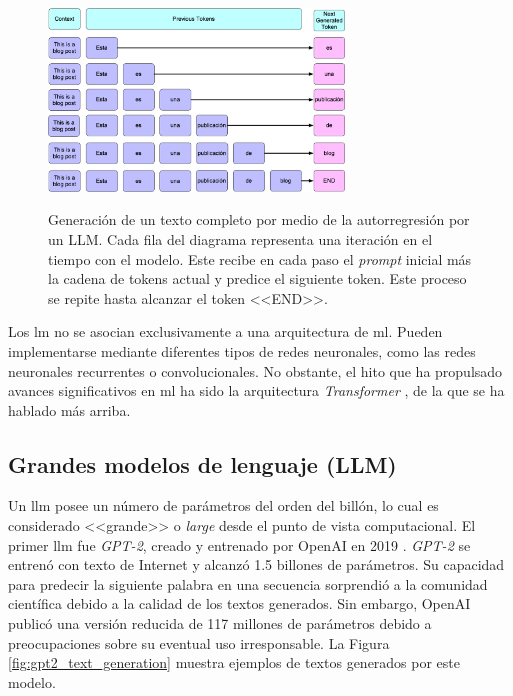 \begin{figure}[H]
    \caption[Generación de un texto completo por medio de la autorregresión por un LLM]{Generación de un texto completo por medio de la autorregresión por un LLM. Cada fila del diagrama representa una iteración en el tiempo con el modelo. Este recibe en cada paso el \emph{prompt} inicial más la cadena de tokens actual y predice el siguiente token. Este proceso se repite hasta alcanzar el token <<END>>.}
    \centering
    \includegraphics[width=0.7\textwidth]{./figuras/text-gen-diagram-autoregressive.png}
    \label{fig:llm_generation_example}
\end{figure}

Los \gls{lm} no se asocian exclusivamente a una arquitectura de \gls{ml}. Pueden implementarse mediante diferentes tipos de redes neuronales, como las redes neuronales recurrentes o convolucionales. No obstante, el hito que ha propulsado avances significativos en \gls{ml} ha sido la arquitectura \emph{Transformer} \citep{vaswaniAttentionAllYou2017}, de la que se ha hablado más arriba.

\subsection{Grandes modelos de lenguaje (LLM)}

Un \gls{llm} posee un número de parámetros del orden del billón, lo cual es considerado <<grande>> o \emph{large} desde el punto de vista computacional. El primer \gls{llm} fue \emph{GPT-2}, creado y entrenado por OpenAI en 2019 \citep{radfordLanguageModelsAre2019}. \emph{GPT-2} se entrenó con texto de Internet y alcanzó 1.5 billones de parámetros. Su capacidad para predecir la siguiente palabra en una secuencia sorprendió a la comunidad científica debido a la calidad de los textos generados. Sin embargo, OpenAI publicó una versión reducida de 117 millones de parámetros debido a preocupaciones sobre su eventual uso irresponsable. La Figura \ref{fig:gpt2_text_generation} muestra ejemplos de textos generados por este modelo.

